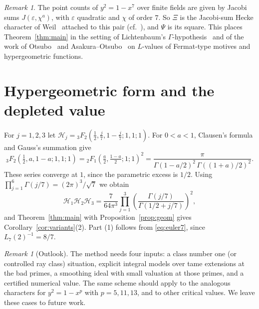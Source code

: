 \documentclass[11pt]{amsart}
\theoremstyle{remark}
\newtheorem{remark}[theorem]{Remark}
\theoremstyle{definition}
\begin{document}
\begin{remark}
The point counts of $y^2=1-x^7$ over finite fields are given by Jacobi sums $J(\varepsilon,\chi^a)$, with $\varepsilon$ quadratic and $\chi$ of order $7$. So $\Xi$ is the Jacobi-sum Hecke character of Weil~\cite{Weil} attached to this pair (cf.~\cite{GrossRohrlich}), and $\Psi$ is its square. This places Theorem~\ref{thm:main} in the setting of Lichtenbaum's $\Gamma$-hypothesis~\cite{Lichtenbaum} and of the work of Otsubo~\cite{OtsuboJacobi} and Asakura--Otsubo~\cite{AsakuraOtsubo} on $L$-values of Fermat-type motives and hypergeometric functions.
\end{remark}

\section{Hypergeometric form and the depleted value}\label{sec:hyp}

For $j=1,2,3$ let $\mathcal H_j={}_3F_2\!\left(\tfrac12,\tfrac j7,1-\tfrac j7;1,1;1\right)$. For $0<a<1$, Clausen's formula and Gauss's summation give~\cite[15.4.20, 16.12.2]{DLMF}
\[
{}_3F_2\!\left(\tfrac12,a,1-a;1,1;1\right)={}_2F_1\!\left(\tfrac a2,\tfrac{1-a}2;1;1\right)^2=\frac{\pi}{\Gamma(1-a/2)^2\,\Gamma((1+a)/2)^2}.
\]
These series converge at $1$, since the parametric excess is $1/2$. Using $\prod_{j=1}^6\Gamma(j/7)=(2\pi)^3/\sqrt7$ we obtain
\[
\mathcal H_1\mathcal H_2\mathcal H_3=\frac{7}{64\pi^3}\prod_{j=1}^{3}\left(\frac{\Gamma(j/7)}{\Gamma(1/2+j/7)}\right)^2,
\]
and Theorem~\ref{thm:main} with Proposition~\ref{prop:geom} gives Corollary~\ref{cor:variants}(2). Part (1) follows from \eqref{eq:euler7}, since $L_7(2)^{-1}=8/7$.

\begin{remark}[Outlook]
The method needs four inputs: a class number one (or controlled ray class) situation, explicit integral models over tame extensions at the bad primes, a smoothing ideal with small valuation at those primes, and a certified numerical value. The same scheme should apply to the analogous characters for $y^2=1-x^p$ with $p=5,11,13$, and to other critical values. We leave these cases to future work. %
\end{remark}
\end{document}

